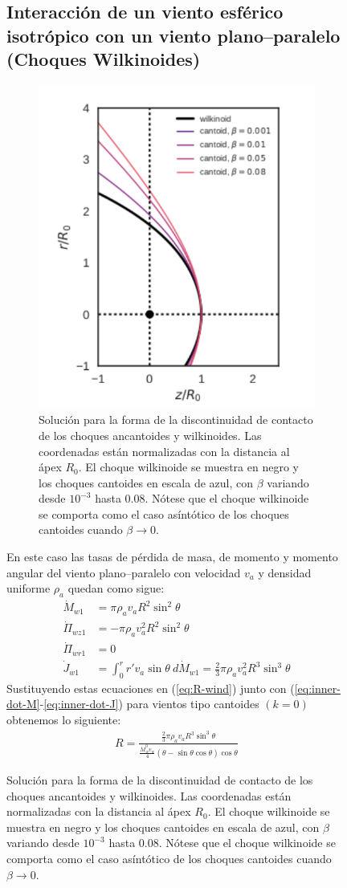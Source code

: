 \begin{figure}
\subsection{Interacción de un viento esférico isotrópico con un viento plano--paralelo (Choques Wilkinoides)}
\label{sec:wilkinoids}
\begin{figure}
  \centering
  \includegraphics[width=0.43\linewidth]{./Figures/cantoid-wilkinoid-shape}
  \caption[Solución para la forma de la discontinuidad de contacto de los choques ancantoides y wilkinoides.]{Solución para la forma de la discontinuidad de contacto de los choques ancantoides y wilkinoides. Las coordenadas están normalizadas con la distancia al ápex $R_0$. El choque wilkinoide se muestra en negro y los choques cantoides en escala de azul, con $\beta$ variando desde $10^{-3}$ hasta 0.08. Nótese que el choque wilkinoide se comporta como el caso asíntótico de los choques cantoides cuando $\beta\to 0$.}
 \label{fig:wilkinoid-solution} 
\end{figure}
En este caso las tasas de pérdida de masa, de momento y momento angular del viento plano--paralelo con velocidad $v_a$ y densidad uniforme $\rho_a$ quedan como sigue:
\begin{align}
  \dot{M}_{w1} &= \pi \rho_a v_a R^2 \sin^2\theta \label{eq:w-dotm}\\
  \dot{\Pi}_{wz1} &= - \pi\rho_a v^2_a R^2 \sin^2\theta\\
  \dot{\Pi}_{wr1} &= 0 \\
  \dot{J}_{w1} &= \int^r_0 r'v_a \sin\theta~d\dot{M}_{w1} = \frac{2}{3}\pi\rho_a v_a^2 R^3 \sin^3\theta \label{eq:w-jw1} 
\end{align}
Sustituyendo estas ecuaciones en (\ref{eq:R-wind}) junto con (\ref{eq:inner-dot-M}-\ref{eq:inner-dot-J}) para vientos tipo cantoides $(k=0)$ obtenemos lo siguiente:
\small
\begin{align}
  R = \frac{\frac{2}{3}\pi\rho_a v_a R^3 \sin^3\theta}{\frac{\dot{M}^0_w v_w}{4}\left(\theta-\sin\theta\cos\theta\right)\cos\theta
}
\end{align}
\end{figure}
